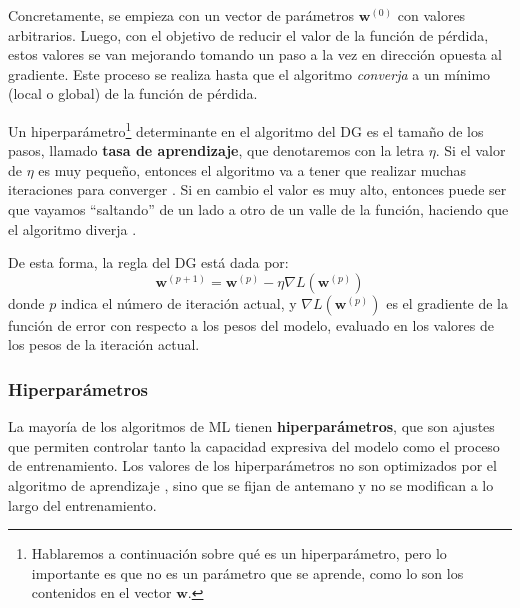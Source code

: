 \documentclass[../../main.tex]{subfiles}
\begin{document}
Concretamente, se empieza con un vector de parámetros \(\bm{w}^{(0)}\) con valores
arbitrarios. Luego, con el objetivo de reducir el valor de la función de pérdida, estos
valores se van mejorando tomando un paso a la vez en dirección opuesta al gradiente. Este
proceso se realiza hasta que el algoritmo \textit{converja} a un mínimo (local o global)
de la función de pérdida.

Un hiperparámetro\footnote{Hablaremos a continuación sobre qué es un hiperparámetro, pero
lo importante es que no es un parámetro que se aprende, como lo son los contenidos en el
vector \(\bm{w}\).} determinante en el algoritmo del DG es el tamaño de los pasos, llamado
\textbf{tasa de aprendizaje}, que denotaremos con la letra \(\eta\). Si el valor de
\(\eta\) es muy pequeño, entonces el algoritmo va a tener que realizar muchas iteraciones
para converger \cite{hands-on-ML-sklearn-tf}. Si en cambio el valor es muy alto, entonces
puede ser que vayamos ``saltando'' de un lado a otro de un valle de la función, haciendo
que el algoritmo diverja \cite{hands-on-ML-sklearn-tf}.

De esta forma, la regla del DG está dada por:
\[
\bm{w}^{(p+1)} = \bm{w}^{(p)} - \eta \nabla L(\bm{w}^{(p)})
\]
donde \(p\) indica el número de iteración actual, y \(\nabla L(\bm{w}^{(p)})\) es el
gradiente de la función de error con respecto a los pesos del modelo, evaluado en los
valores de los pesos de la iteración actual.


\subsubsection{Hiperparámetros}
La mayoría de los algoritmos de ML tienen \textbf{hiperparámetros}, que son ajustes que
permiten controlar tanto la capacidad expresiva del modelo como el proceso de
entrenamiento. Los valores de los hiperparámetros no son optimizados por el algoritmo de
aprendizaje \cite{deep-learning}, sino que se fijan de antemano y no se modifican a lo
largo del entrenamiento.
\end{document}
